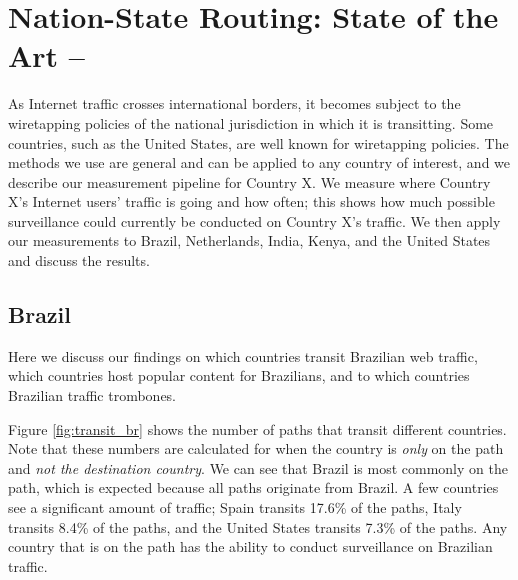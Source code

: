 \section{Nation-State Routing: State of the Art -- }
\label{measure}

As Internet traffic crosses international borders, it becomes subject to the wiretapping policies of the national jurisdiction in which it is transitting.  Some countries, such as the United States, are well known for wiretapping policies.  The methods we use are general and can be applied to any country of interest, and we describe our measurement pipeline for Country X. We measure where Country X's Internet users' traffic is going and how often; this shows how much possible surveillance could currently be conducted on Country X's traffic.  We then apply our measurements to Brazil, Netherlands, India, Kenya, and the United States and discuss the results.

\subsection{Brazil}
Here we discuss our findings on which countries transit Brazilian web traffic, which countries host popular content for Brazilians, and to which countries Brazilian traffic trombones.  


Figure \ref{fig:transit_br} shows the number of paths that transit different countries.  Note that these numbers are calculated for when the country is \textit{only} on the path and \textit{not the destination country}.  We can see that Brazil is most commonly on the path, which is expected because all paths originate from Brazil.  A few countries see a significant amount of traffic; Spain transits 17.6\% of the paths, Italy transits 8.4\% of the paths, and the United States transits 7.3\% of the paths.  Any country that is on the path has the ability to conduct surveillance on Brazilian traffic.  

